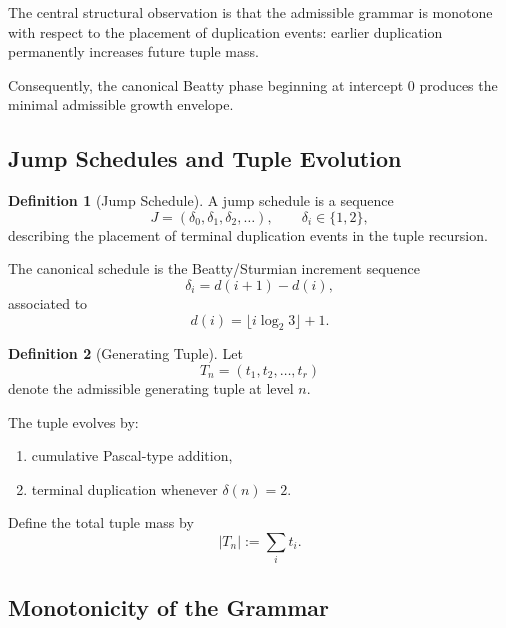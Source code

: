 \documentclass[12pt, oneside]{article}
\numberwithin{equation}{section}
\theoremstyle{definition}
\newtheorem{definition}{Definition}[section]
\theoremstyle{plain}
\theoremstyle{remark}
\begin{document}
The central structural observation is that the admissible grammar is
monotone with respect to the placement of duplication events:
earlier duplication permanently increases future tuple mass.

Consequently, the canonical Beatty phase beginning at intercept $0$
produces the minimal admissible growth envelope.


\subsection{Jump Schedules and Tuple Evolution}


\begin{definition}[Jump Schedule]
A jump schedule is a sequence
\[
J=(\delta_0,\delta_1,\delta_2,\dots),
\qquad
\delta_i\in\{1,2\},
\]
describing the placement of terminal duplication events in the
tuple recursion.

The canonical schedule is the Beatty/Sturmian increment sequence
\[
\delta_i=d(i+1)-d(i),
\]
associated to
\[
d(i)=\lfloor i\log_2 3\rfloor+1.
\]
\end{definition}


\begin{definition}[Generating Tuple]
Let
\[
T_n=(t_1,t_2,\dots,t_r)
\]
denote the admissible generating tuple at level $n$.

The tuple evolves by:
\begin{enumerate}
\item cumulative Pascal-type addition,
\item terminal duplication whenever $\delta(n)=2$.
\end{enumerate}

Define the total tuple mass by
\[
|T_n|:=\sum_i t_i.
\]
\end{definition}


\subsection{Monotonicity of the Grammar}

\end{document}
